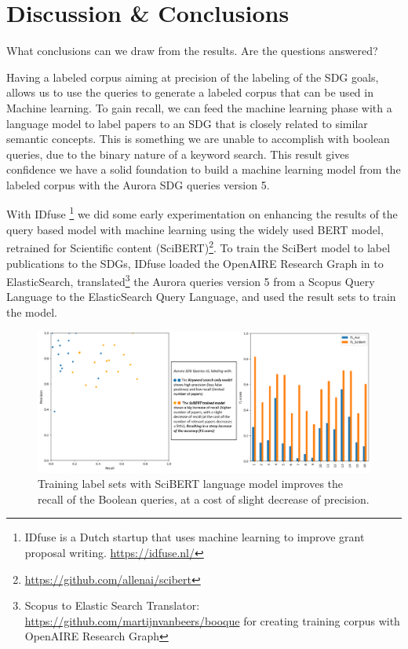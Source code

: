 \documentclass{article}
\begin{document}
\section{Discussion \& Conclusions}
What conclusions can we draw from the results. Are the questions answered?

Having a labeled corpus aiming at precision of the labeling of the SDG goals, allows us to use the queries to generate a labeled corpus that can be used in Machine learning. \cite{zhang_matching_2020}  To gain recall, we can feed the machine learning phase with a language model to label papers to an SDG that is closely related to similar semantic concepts. This is something we are unable to accomplish with boolean queries, due to the binary nature of a keyword search. This result gives confidence we have a solid foundation to build a machine learning model from the labeled corpus with the Aurora SDG queries version 5. 

With IDfuse \footnote{IDfuse is a Dutch startup that uses machine learning to improve grant proposal writing. \url{https://idfuse.nl/} } we did some early experimentation on enhancing the results of the query based model with machine learning using the widely used BERT model, retrained for Scientific content (SciBERT)\footnote{\url{https://github.com/allenai/scibert}}. 
To train the SciBert model to label publications to the SDGs, IDfuse loaded the OpenAIRE Research Graph in to ElasticSearch, translated\footnote{Scopus to Elastic Search Translator: \url{https://github.com/martijnvanbeers/booque} for creating training corpus with OpenAIRE Research Graph} the Aurora queries version 5 from a Scopus Query Language to the ElasticSearch Query Language, and used the result sets to train the model.

\begin{figure}[H]
	\centering
  \includegraphics[width=\textwidth]{figures/BERTmodel-improves-recall.png}
	\caption{Training label sets with SciBERT language model improves the recall of the Boolean queries, at a cost of slight decrease of precision.}
	\label{BERTmodel}
\end{figure}
\end{document}
